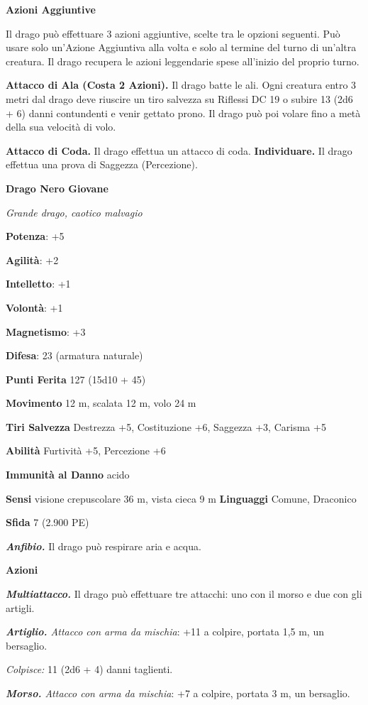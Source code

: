 \begin{multicols}{2}
\textbf{Azioni Aggiuntive}

Il drago può effettuare 3 azioni aggiuntive, scelte tra le opzioni
seguenti. Può usare solo un'Azione Aggiuntiva alla volta e solo al
termine del turno di un'altra creatura. Il drago recupera le azioni
leggendarie spese all'inizio del proprio turno.

\textbf{Attacco di Ala (Costa 2 Azioni).} Il drago batte le ali. Ogni
creatura entro 3 metri dal drago deve riuscire un tiro salvezza su Riflessi DC 19 o subire 13 (2d6 + 6) danni contundenti e venir gettato
prono. Il drago può poi volare fino a metà della sua velocità di volo.

\textbf{Attacco di Coda.} Il drago effettua un attacco di coda.
\textbf{Individuare.} Il drago effettua una prova di Saggezza
(Percezione).

\textbf{Drago Nero Giovane}

\emph{Grande drago, caotico malvagio}

\textbf{Potenza}: +5

\textbf{Agilità}: +2

\textbf{Intelletto}: +1

\textbf{Volontà}: +1

\textbf{Magnetismo}: +3

\textbf{Difesa}: 23 (armatura naturale)

\textbf{Punti Ferita} 127 (15d10 + 45)

\textbf{Movimento} 12 m, scalata 12 m, volo 24 m

\textbf{Tiri Salvezza} Destrezza +5, Costituzione +6, Saggezza +3,
Carisma +5

\textbf{Abilità} Furtività +5, Percezione +6

\textbf{Immunità al Danno} acido

\textbf{Sensi} visione crepuscolare 36 m, vista cieca 9 m
\textbf{Linguaggi} Comune, Draconico

\textbf{Sfida} 7 (2.900 PE)

\emph{\textbf{Anfibio.}} Il drago può respirare aria e acqua.

\textbf{Azioni}

\emph{\textbf{Multiattacco.}} Il drago può effettuare tre attacchi: uno
con il morso e due con gli artigli.

\emph{\textbf{Artiglio.} Attacco con arma da mischia}: +11 a colpire,
portata 1,5 m, un bersaglio.

\emph{Colpisce:} 11 (2d6 + 4) danni taglienti.

\emph{\textbf{Morso.} Attacco con arma da mischia}: +7 a colpire,
portata 3 m, un bersaglio.


\end{multicols}
